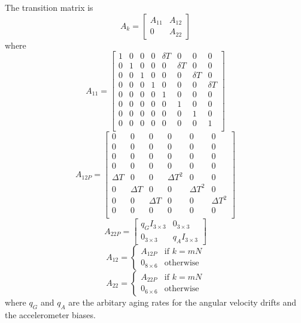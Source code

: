 \documentclass[a4paper]{report}
\numberwithin{equation}{chapter}
\begin{document}
\bigskip

The transition matrix is
\begin{equation}
A_k =
\begin{bmatrix}
A_{11} & A_{12}\\
0 & A_{22}
\end{bmatrix}
\end{equation}
where
\begin{equation}
A_{11} =
\begin{bmatrix}
1 & 0 & 0 & 0 & \delta T & 0 & 0 & 0\\
0 & 1 & 0 & 0 & 0 & \delta T & 0 & 0\\
0 & 0 & 1 & 0 & 0 & 0 & \delta T & 0\\
0 & 0 & 0 & 1 & 0 & 0 & 0 & \delta T\\
0 & 0 & 0 & 0 & 1 & 0 & 0 & 0\\
0 & 0 & 0 & 0 & 0 & 1 & 0 & 0\\
0 & 0 & 0 & 0 & 0 & 0 & 1 & 0\\
0 & 0 & 0 & 0 & 0 & 0 & 0 & 1\\
\end{bmatrix}
\end{equation}
\begin{equation}
A_{12P} =
\begin{bmatrix}
0 & 0 & 0 & 0 & 0 & 0\\
0 & 0 & 0 & 0 & 0 & 0\\
0 & 0 & 0 & 0 & 0 & 0\\
0 & 0 & 0 & 0 & 0 & 0\\
\Delta T & 0 & 0 & \Delta T^2 & 0 & 0\\
0 & \Delta T & 0 & 0 & \Delta T^2 & 0\\
0 & 0 & \Delta T & 0 & 0 & \Delta T^2\\
0 & 0 & 0 & 0 & 0 & 0\\
\end{bmatrix}
\end{equation}
\begin{equation}
A_{22P} =
\begin{bmatrix}
q_G I_{3 \times 3} & 0_{3 \times 3}\\
0_{3 \times 3} & q_A I_{3 \times 3}
\end{bmatrix}
\end{equation}
\begin{equation}
A_{12} =
\begin{cases}
A_{12P} & \text{if $k = mN$}\\
0_{8 \times 6} & \text{otherwise}
\end{cases}
\end{equation}
\begin{equation}
A_{22} =
\begin{cases}
A_{22P} & \text{if $k = mN$}\\
0_{6 \times 6} & \text{otherwise}
\end{cases}
\end{equation}
where $q_G$ and $q_A$ are the arbitary aging rates for the angular velocity drifts and the accelerometer biases.
\end{document}
